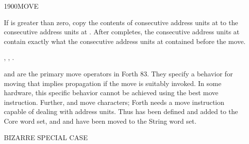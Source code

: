 \begin{worddef}{1900}{MOVE}
\item {}

	If  is greater than zero, copy the contents of 
	consecutive address units at  to the 
	consecutive address units at . After 
	completes, the  consecutive address units at 
	contain exactly what the  consecutive address units at
	 contained before the move.

\see	{},
	,
	.

	\begin{rationale} %
		 and  are the primary
		move operators in Forth 83. They specify a behavior for moving
		that implies propagation if the move is suitably invoked. In
		some hardware, this specific behavior cannot be achieved using
		the best move instruction. Further,  and
		 move characters; Forth needs a move
		instruction capable of dealing with address units. Thus
		 has been defined and added to the Core word set,
		and  and  have been
		moved to the String word set.
	\end{rationale}

	\begin{testing} %
		 \hfill {} BIZARRE SPECIAL CASE \\

		 \\

		 \\

		 \\

		 \\

		 \\
	\end{testing}
\end{worddef}


